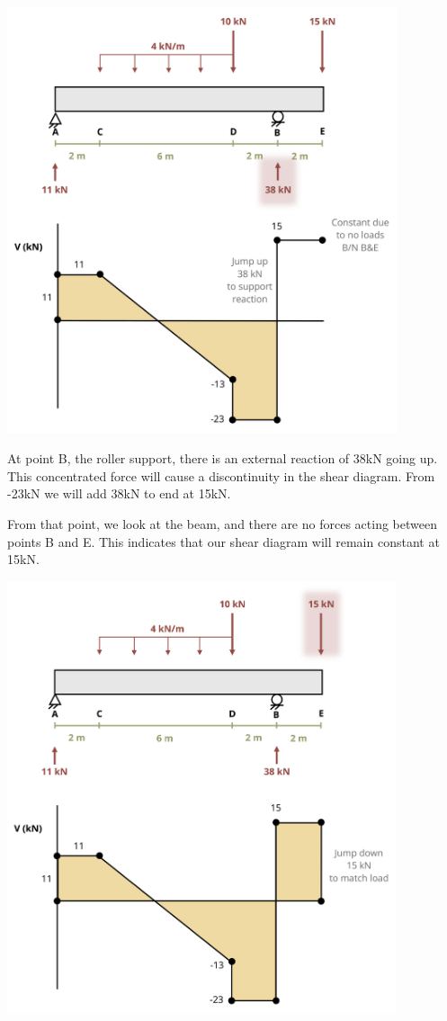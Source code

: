 \documentclass[
  letterpaper,
  DIV=11,
  numbers=noendperiod]{scrreprt}
\begin{document}
\begin{tcolorbox}
\begin{tcolorbox}
\begin{center}
\includegraphics[width=4.51042in,height=\textheight]{images/CH7 PNGs/example 7.3 part 6.png}
\end{center}

At point B, the roller support, there is an external reaction of 38kN
going up. This concentrated force will cause a discontinuity in the
shear diagram. From -23kN we will add 38kN to end at 15kN.

From that point, we look at the beam, and there are no forces acting
between points B and E. This indicates that our shear diagram will
remain constant at 15kN.

\begin{center}
\includegraphics[width=4.5in,height=\textheight]{images/CH7 PNGs/example 7.3 part 7.png}
\end{center}


\end{tcolorbox}
\end{tcolorbox}
\end{document}
